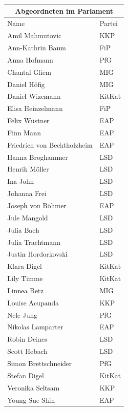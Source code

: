 \documentclass{sasbase}
\begin{document}
\begin{center}
    \begin{tabular}{ |p{5cm}|p{3cm}| }
     \hline
     \multicolumn{2}{|c|}{Abgeordneten im Parlament} \\
     \hline
     Name & Partei \\
     \hline
    Amil Mahmutovic & KKP \\
    Ann-Kathrin Baum & FiP\\
    Anna Hofmann & PfG\\
    Chantal Gliem & MIG\\
    Daniel Höfig & MIG\\
    Daniel Wizemann & KitKat\\
    Elisa Heinzelmann & FiP\\
    Felix Wüstner & EAP\\
    Finn Mann & EAP\\
    Friedrich von Bechtholzheim & EAP\\
    Hanna Broghammer & LSD\\
    Henrik Möller & LSD\\
    Ina John & LSD\\
    Johanna Frei & LSD\\
    Joseph von Böhmer & EAP\\
    Jule Mangold & LSD\\
    Julia Bach & LSD\\
    Julia Trachtmann & LSD\\
    Justin Hordorkovski & LSD\\
    Klara Digel & KitKat\\
    Lily Timme & KitKat\\
    Linnea Betz & MIG\\
    Louise Acupanda & KKP\\
    Nele Jung & PfG\\
    Nikolas Lamparter & EAP\\
    Robin Deines & LSD\\
    Scott Hebach & LSD\\
    Simon Brettschneider & PfG\\
    Stefan Digel & KitKat\\
    Veronika Seltsam & KKP\\
    Young-Sue Shin & EAP\\
    \hline
    \end{tabular}
\end{center}
\end{document}

